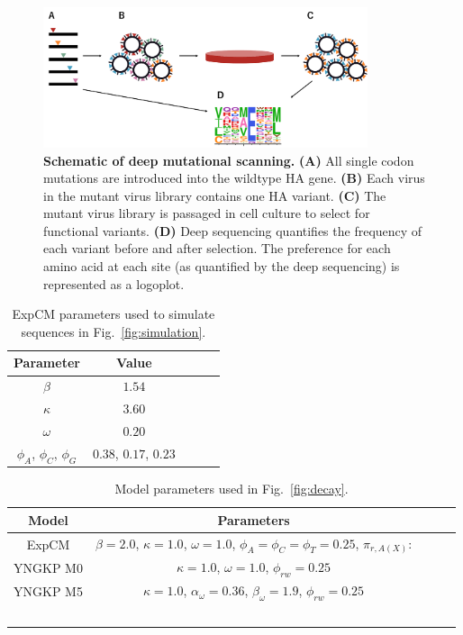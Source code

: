 \documentclass[11pt]{article}
\begin{document}
\begin{figure}
\centerline{\includegraphics[width=0.85\textwidth]{figures/dms}}
\caption{\label{fig:dms}
\textbf{Schematic of deep mutational scanning.} 
\textbf{(A)} All single codon mutations are introduced into the wildtype HA gene. 
\textbf{(B)} Each virus in the mutant virus library contains one HA variant. 
\textbf{(C)} The mutant virus library is passaged in cell culture to select for functional variants. 
\textbf{(D)} Deep sequencing quantifies the frequency of each variant before and after selection. 
The preference for each amino acid at each site (as quantified by the deep sequencing) is represented as a logoplot.
}
\end{figure}

\begin{table}[t!]
\caption{\label{tab:simulation_params}
ExpCM parameters used to simulate sequences in Fig.~\ref{fig:simulation}.}
      \begin{tabular}{ccccc}
        \hline
          Parameter & Value\\ \hline
       	$\beta$ & $1.54$\\
	$\kappa$ & $3.60$\\
	$\omega$ & $0.20$\\
	$\phi_A$, $\phi_C$, $\phi_G$& $0.38$, $0.17$, $0.23$\\
      \end{tabular}
\end{table}

\begin{table}[t!]
\caption{\label{tab:decay_params}
Model parameters used in  Fig.~\ref{fig:decay}.}
      \begin{tabular}{ccccc}
        \hline
          Model & Parameters\\ \hline
          ExpCM & $\beta=2.0$, $\kappa=1.0$, $\omega=1.0$, $\phi_A=\phi_C=\phi_T=0.25$, $\pi_{r, A\left(X\right)}$:\cite{Doud2016accurate}\\
          YNGKP M0 & $\kappa=1.0$, $\omega=1.0$, $\phi_{rw}=0.25$\\
          YNGKP M5 & $\kappa=1.0$, $\alpha_\omega=0.36$, $\beta_\omega=1.9$, $\phi_{rw}=0.25$\\\
      \end{tabular}
\end{table}




\clearpage 


\end{document}
